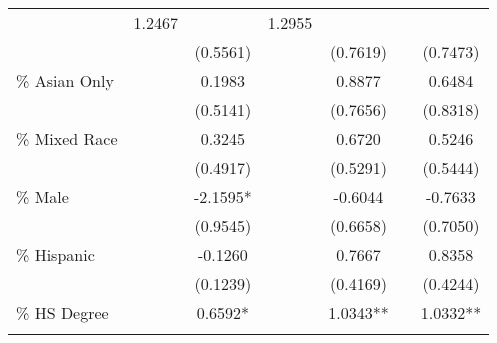 \begin{tabular}{lllllll}
  \multicolumn{1}{c}{} &
  \multicolumn{1}{c}{1.2467} &
  \multicolumn{1}{c}{} &
  \multicolumn{1}{c}{1.2955} \\
\multicolumn{1}{l}{} &
  \multicolumn{1}{c}{} &
  \multicolumn{1}{c}{(0.5561)} &
  \multicolumn{1}{c}{} &
  \multicolumn{1}{c}{(0.7619)} &
  \multicolumn{1}{c}{} &
  \multicolumn{1}{c}{(0.7473)} \\
\multicolumn{1}{l}{\% Asian Only} &
  \multicolumn{1}{c}{} &
  \multicolumn{1}{c}{0.1983} &
  \multicolumn{1}{c}{} &
  \multicolumn{1}{c}{0.8877} &
  \multicolumn{1}{c}{} &
  \multicolumn{1}{c}{0.6484} \\
\multicolumn{1}{l}{} &
  \multicolumn{1}{c}{} &
  \multicolumn{1}{c}{(0.5141)} &
  \multicolumn{1}{c}{} &
  \multicolumn{1}{c}{(0.7656)} &
  \multicolumn{1}{c}{} &
  \multicolumn{1}{c}{(0.8318)} \\
\multicolumn{1}{l}{\% Mixed Race} &
  \multicolumn{1}{c}{} &
  \multicolumn{1}{c}{0.3245} &
  \multicolumn{1}{c}{} &
  \multicolumn{1}{c}{0.6720} &
  \multicolumn{1}{c}{} &
  \multicolumn{1}{c}{0.5246} \\
\multicolumn{1}{l}{} &
  \multicolumn{1}{c}{} &
  \multicolumn{1}{c}{(0.4917)} &
  \multicolumn{1}{c}{} &
  \multicolumn{1}{c}{(0.5291)} &
  \multicolumn{1}{c}{} &
  \multicolumn{1}{c}{(0.5444)} \\
\multicolumn{1}{l}{\% Male} &
  \multicolumn{1}{c}{} &
  \multicolumn{1}{c}{-2.1595*} &
  \multicolumn{1}{c}{} &
  \multicolumn{1}{c}{-0.6044} &
  \multicolumn{1}{c}{} &
  \multicolumn{1}{c}{-0.7633} \\
\multicolumn{1}{l}{} &
  \multicolumn{1}{c}{} &
  \multicolumn{1}{c}{(0.9545)} &
  \multicolumn{1}{c}{} &
  \multicolumn{1}{c}{(0.6658)} &
  \multicolumn{1}{c}{} &
  \multicolumn{1}{c}{(0.7050)} \\
\multicolumn{1}{l}{\% Hispanic} &
  \multicolumn{1}{c}{} &
  \multicolumn{1}{c}{-0.1260} &
  \multicolumn{1}{c}{} &
  \multicolumn{1}{c}{0.7667} &
  \multicolumn{1}{c}{} &
  \multicolumn{1}{c}{0.8358} \\
\multicolumn{1}{l}{} &
  \multicolumn{1}{c}{} &
  \multicolumn{1}{c}{(0.1239)} &
  \multicolumn{1}{c}{} &
  \multicolumn{1}{c}{(0.4169)} &
  \multicolumn{1}{c}{} &
  \multicolumn{1}{c}{(0.4244)} \\
\multicolumn{1}{l}{\% HS Degree} &
  \multicolumn{1}{c}{} &
  \multicolumn{1}{c}{0.6592*} &
  \multicolumn{1}{c}{} &
  \multicolumn{1}{c}{1.0343**} &
  \multicolumn{1}{c}{} &
  \multicolumn{1}{c}{1.0332**} \\
\multicolumn{1}{l}{} &
  \multicolumn{1}{c}{} &

\end{tabular}
